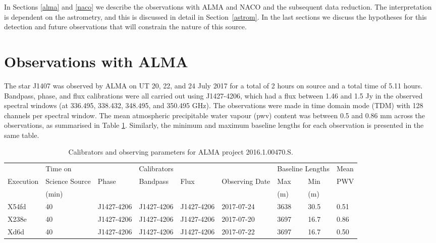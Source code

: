 \documentclass{aa} %
\begin{document}
In Sections \ref{alma} and \ref{naco} we describe the observations with ALMA and NACO and the subsequent data reduction.
%
The interpretation is dependent on the astrometry, and this is discussed in detail in Section~\ref{astrom}.
%
In the last sections we discuss the hypotheses for this detection and future observations that will constrain the nature of this source.

\section{Observations with ALMA\label{alma}} %

The star J1407 was observed by ALMA on UT 20, 22, and 24 July 2017 for a total of 2 hours on source and a total time of  5.11 hours.
%
Bandpass, phase, and flux calibrations were all carried out using J1427-4206, which had a flux between 1.46 and 1.5 Jy in the observed spectral windows (at 336.495, 338.432, 348.495, and 350.495 GHz).
%
The observations were made in time domain mode (TDM) with 128 channels per spectral window.
%
The mean atmospheric precipitable water vapour (pwv) content was between 0.5 and 0.86 mm across the observations, as summarised in Table \ref{tab:Obs_params}.
%
Similarly, the minimum and maximum baseline lengths for each observation is presented in the same table. 

\begin{table}
\caption{Calibrators and observing parameters for ALMA project 2016.1.00470.S.}
\begin{tabular}{lllllllll}
\hline \hline
&Time on & \multicolumn{3}{c}{Calibrators} & & \multicolumn{2}{c}{Baseline Lengths} & Mean \\ \cline{3-5} \cline{7-8}
Execution  & Science Source & Phase & Bandpass & Flux & Observing Date & Max & Min & PWV\\
 & (min) &&&&&(m) &(m)\\
 \hline
X54fd & 40 & J1427-4206 & J1427-4206 & J1427-4206 & 2017-07-24 & 3638 & 30.5 &0.51\\
X238e & 40 & J1427-4206 & J1427-4206 & J1427-4206 & 2017-07-20 & 3697 & 16.7 &0.86\\
Xd6d & 40 & J1427-4206 & J1427-4206 & J1427-4206 & 2017-07-22 & 3697 & 16.7 &0.50\\
\hline
\end{tabular}
\label{tab:Obs_params}
\end{table}
\end{document}
